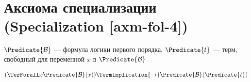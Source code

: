 
\section{Аксиома специализации (Specialization [axm-fol-4])}

\hypertarget{axm-fol-4}{}
\begin{axiom}
\label{entity:axm-fol-4}
$\Predicate{\mathcal{B}}$ --- формула логики первого порядка,
$\Predicate{t}$ --- терм, свободный для переменной $x$ в $\Predicate{\mathcal{B}}$

\[
(\TerForall x \Predicate{\mathcal{B}}(x)) \TermImplication{\to} \Predicate{\mathcal{B}}(\Predicate{t})
\]
\end{axiom}